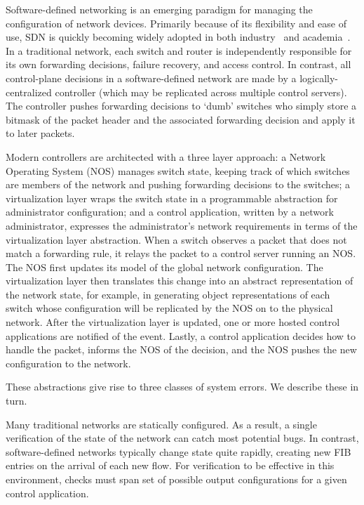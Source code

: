 Software-defined networking is an emerging paradigm for managing the
configuration of network devices. Primarily because of its flexibility and ease of use, SDN is
quickly becoming widely adopted in both industry~\cite{nicirahomepage,
bigswitch} and academia~\cite{nox, pox, ethane}. 
In a traditional network, each switch and router is independently responsible for
its own forwarding decisions, failure recovery, and access control. In
contrast, all control-plane decisions in a software-defined network are made by
a logically-centralized controller (which may be replicated across multiple control servers). 
The controller pushes forwarding decisions to `dumb' 
switches who simply store a bitmask of the packet header and the associated forwarding decision and apply it 
to later packets. 


Modern controllers are architected with a three layer approach: a Network Operating System (NOS) manages switch state, keeping track of which switches are members of the network and pushing forwarding decisions to the switches; a virtualization layer wraps the switch state in a programmable abstraction for administrator configuration; and a control application, written by a network administrator, expresses the administrator's network requirements in terms of the virtualization layer abstraction.
 When a
switch observes a packet that does not match a forwarding rule, 
it relays the packet to a control server running an NOS. 
The NOS first updates its model of the global network configuration.
The virtualization layer then translates this change into an abstract 
representation of the network state, for example, in generating object representations of each switch whose configuration will be replicated by the NOS on to the physical network. After the virtualization layer is updated, one or more hosted control
applications are notified of the event. Lastly, a
control application decides how to handle the packet, informs the NOS of the decision,
and the NOS pushes the new configuration to the network.

These abstractions give rise to three classes of system errors. We describe these in turn.

 Many traditional networks are statically configured.
As a result, a single verification of the state of the network can catch most potential bugs. 
In contrast, software-defined networks typically change state quite rapidly, creating new FIB entries on the arrival of each new flow.  For verification to be
effective in this environment, checks must span set of possible output configurations for a given control
application.

